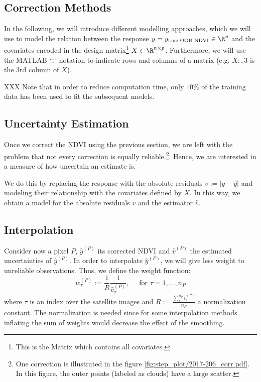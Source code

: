 {    \subsection{Correction Methods}{
        \label{sec:corr_methods}
        In the following, we will introduce different modelling approaches, which we will use to model the relation between the response $y = y_{\text{true OOB NDVI}}\in \R^n$ and the covariates encoded in the design matrix\footnote{This is the Matrix which contains all covariates.} $X\in\R^{n \times p}$. Furthermore, we will use the MATLAB `\texttt{:}' notation to indicate rows and columns of a matrix (e.g. $X{:,3}$ is the $3$rd column of $X$). 

        XXX Note that in order to reduce computation time, only $10\%$ of the training data has been used to fit the subsequent models.

        
    }
    
    \subsection{Uncertainty Estimation}{
        \label{sec:corr_uncertainty}
        Once we correct the NDVI using the previous section, we are left with the problem that not every correction is equally reliable.\footnote{One correction is illustrated in the figure \ref{fig:step_plot/2017-206_corr.pdf}. In this figure, the outer points (labeled as clouds) have a large scatter.}. Hence, we are interested in a measure of how uncertain an estimate is. 

        We do this by replacing the response with the absolute residuals $v := \left|y -\hat y\right|$ and modeling their relationship with the covariates defined by $X$.  In this way, we obtain a model for the absolute residuals $v$ and the estimator $\hat v$.  
    }

    \subsection{Interpolation}{
        \label{sec:corr_link}
        Consider now a pixel $P$, $\hat y^{(P)}$ its corrected NDVI and $\hat v^{(P)}$ the estimated uncertainties of $\hat y^{(P)}$. In order to interpolate $\hat y^{(P)}$, we will give less weight to unreliable observations. Thus, we define the weight function: 
        \begin{equation}
            \label{eq:corr_link}
            w^{(P)}_\tau:=\frac{1}{R} \frac{1}{\hat v^{(P)}_\tau}, 
            \quad \text{ for } \tau=1,\dots, n_P
        \end{equation}  
        where $\tau$ is an index over the satellite images and $R:=\frac{\sum_i^{n_P}\hat v^{(P)}_i}{n_P}$ a normalization constant. The normalization is needed since for some interpolation methods inflating the sum of weights would decrease the effect of the smoothing. 
    }
}


